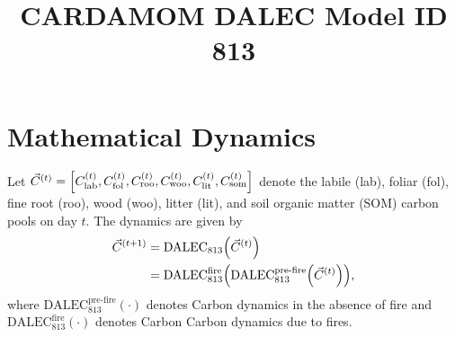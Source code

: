 \documentclass{article}
\title{CARDAMOM DALEC Model ID 813}
\begin{document}
	\maketitle

	\section{Mathematical Dynamics}

		Let $\vec{C}^{(t)} = \qty[C_\text{lab}^{(t)}, C_\text{fol}^{(t)}, C_\text{roo}^{(t)}, C_\text{woo}^{(t)}, C_\text{lit}^{(t)}, C_\text{som}^{(t)}]$ denote the labile (lab), foliar (fol), fine root (roo), wood (woo), litter (lit), and soil organic matter (SOM) carbon pools on day $t$.  The dynamics are given by
		\begin{align*}
			\vec{C}^{(t+1)} &= \text{DALEC}_{813}\qty(\vec{C}^{(t)})\\
			&= \text{DALEC}_{813}^\text{fire}\qty(\text{DALEC}_{813}^\text{pre-fire}\qty(\vec{C}^{(t)})),
		\end{align*}
		where $\text{DALEC}_{813}^\text{pre-fire}(\cdot)$ denotes Carbon dynamics in the absence of fire and $\text{DALEC}_{813}^\text{fire}(\cdot)$ denotes Carbon Carbon dynamics due to fires.
\end{document}
